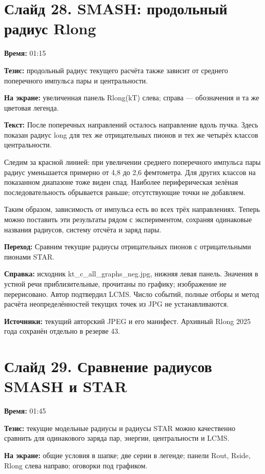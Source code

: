 \documentclass[11pt,a4paper]{article}
\begin{document}
\clearpage
\section*{Слайд 28. SMASH: продольный радиус Rlong}
\textbf{Время:} 01:15

\textbf{Тезис:} продольный радиус текущего расчёта также зависит от среднего поперечного импульса пары и центральности.

\textbf{На экране:} увеличенная панель Rlong(kT) слева; справа — обозначения и та же цветовая легенда.

\textbf{Текст:} После поперечных направлений осталось направление вдоль пучка. Здесь показан радиус long для тех же отрицательных пионов и тех же четырёх классов центральности.

Следим за красной линией: при увеличении среднего поперечного импульса пары радиус уменьшается примерно от 4,8 до 2,6 фемтометра. Для других классов на показанном диапазоне тоже виден спад. Наиболее периферическая зелёная последовательность обрывается раньше; отсутствующие точки не добавляем.

Таким образом, зависимость от импульса есть во всех трёх направлениях. Теперь можно поставить эти результаты рядом с экспериментом, сохраняя одинаковые названия радиусов, систему отсчёта и заряд пары.

\textbf{Переход:} Сравним текущие радиусы отрицательных пионов с отрицательными пионами STAR.

\textbf{Справка:} исходник kt\_c\_all\_graphs\_neg.jpg, нижняя левая панель. Значения в устной речи приблизительные, прочитаны по графику; изображение не перерисовано. Автор подтвердил LCMS. Число событий, полные отборы и метод расчёта неопределённостей текущих точек из JPG не устанавливаются.

\textbf{Источники:} текущий авторский JPEG и его манифест. Архивный Rlong 2025 года сохранён отдельно в резерве 43.

\clearpage
\section*{Слайд 29. Сравнение радиусов SMASH и STAR}
\textbf{Время:} 01:45

\textbf{Тезис:} текущие модельные радиусы и радиусы STAR можно качественно сравнить для одинакового заряда пар, энергии, центральности и LCMS.

\textbf{На экране:} общие условия в шапке; две серии в легенде; панели Rout, Rside, Rlong слева направо; оговорки под графиком.
\end{document}
